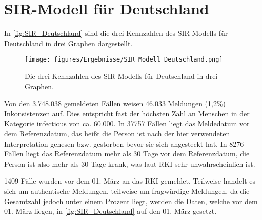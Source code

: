 \section{SIR-Modell für Deutschland}\label{sec:Resultate-SIR}
In \autoref{fig:SIR_Deutschland} sind die drei Kennzahlen des SIR-Modells für Deutschland in drei Graphen dargestellt.
\begin{figure}[H]
    \centering
    \texttt{[image: figures/Ergebnisse/SIR\_Modell\_Deutschland.png]}
    \caption{Die drei Kennzahlen des SIR-Modells für Deutschland in drei Graphen.}
    \label{fig:SIR_Deutschland}
\end{figure}

Von den 3.748.038 gemeldeten Fällen weisen 46.033  Meldungen (1,2\%) Inkonsistenzen auf. Dies entspricht fast der höchsten Zahl an Menschen in der Kategorie \glqq{}infectious\grqq{} von ca. 60.000.
In 37757 Fällen liegt das Meldedatum vor dem Referenzdatum, das heißt die Person ist nach der hier verwendeten Interpretation genesen bzw. gestorben bevor sie sich angesteckt hat. In 8276 Fällen liegt das Referenzdatum mehr als 30 Tage vor dem Referenzdatum, die Person ist also mehr als 30 Tage krank, was laut RKI sehr unwahrscheinlich ist.

1409 Fälle wurden vor dem 01. März an das RKI gemeldet. Teilweise handelt es sich um authentische Meldungen, teilweise um fragwürdige Meldungen, da die Gesamtzahl jedoch unter einem Prozent liegt, werden die Daten, welche vor dem 01. März liegen, in \autoref{fig:SIR_Deutschland} auf den 01. März gesetzt.